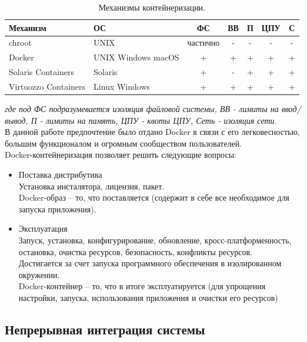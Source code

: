 \documentclass[a4paper,14pt]{extreport} %
\begin{document}
\begin{table}[H]
\caption {Механизмы контейнеризации.} \label{tab:containerization_mechanisms}
\begin{center}
\begin{tabular}{| p{5cm} | p{2cm}  | c | c| c | c | c |}
\hline
\textbf{Механизм} & \textbf{ОС} & \textbf{ФС} & \textbf{ВВ} & \textbf{П} & \textbf{ЦПУ} & \textbf{С} \\
\hline
chroot & UNIX & частично & - & - & - & - \\
\hline
Docker & UNIX Windows macOS & + & + & + & + & + \\
\hline
Solaris Containers & Solaris & + & - & + & + & + \\
\hline
Virtuozzo Containers & Linux Windows & + & + & + & + & + \\
\hline
\end{tabular}
\end{center}
\end{table}
\textit{где под ФС подразумевается изоляция файловой системы, ВВ - лимиты на ввод/вывод, П - лимиты на память, ЦПУ - квоты ЦПУ, Сеть - изоляция сети.} \\

В данной работе предпочтение было отдано Docker в связи с его легковесностью, большим функционалом и огромным сообществом пользователей\cite{DOCKER_DOCS}. \\

Docker-контейнеризация позволяет решить следующие вопросы:
\begin{itemize}
\item Поставка дистрибутива \\
Установка инсталятора, лицензия, пакет. \\
Docker-образ -- то, что поставляется (содержит в себе все необходимое для запуска приложения).
\item Эксплуатация \\
Запуск, установка, конфигурирование, обновление, кросс-платформенность, остановка, очистка ресурсов, безопасность, конфликты ресурсов. \\
Достигается за счет запуска программного обеспечения в изолированном окружении. \\
Docker-контейнер -- то, что в итоге эксплуатируется (для упрощения настройки, запуска, использования приложения и очистки его ресурсов)
\end{itemize}

\subsection{Непрерывная интеграция системы}
\end{document}

